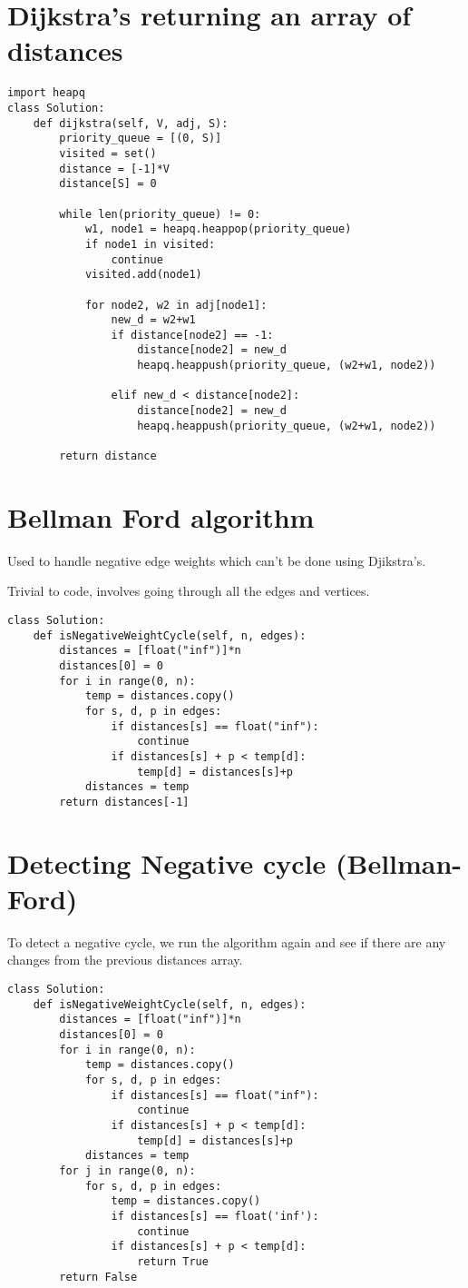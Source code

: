 \documentclass[24pt, a4]{article}
\begin{document}
\section{Dijkstra's returning an array of distances}
\begin{lstlisting}
import heapq
class Solution:
    def dijkstra(self, V, adj, S):
        priority_queue = [(0, S)]
        visited = set()
        distance = [-1]*V
        distance[S] = 0

        while len(priority_queue) != 0:
            w1, node1 = heapq.heappop(priority_queue)
            if node1 in visited:
                continue
            visited.add(node1)

            for node2, w2 in adj[node1]:
                new_d = w2+w1
                if distance[node2] == -1:
                    distance[node2] = new_d
                    heapq.heappush(priority_queue, (w2+w1, node2))

                elif new_d < distance[node2]:
                    distance[node2] = new_d
                    heapq.heappush(priority_queue, (w2+w1, node2))
        
        return distance
\end{lstlisting}
\newpage
\section{Bellman Ford algorithm}
Used to handle negative edge weights which can't be done using Djikstra's.

Trivial to code, involves going through all the edges and vertices.

\begin{lstlisting}
class Solution:
	def isNegativeWeightCycle(self, n, edges):
		distances = [float("inf")]*n
		distances[0] = 0
		for i in range(0, n):
		    temp = distances.copy()
		    for s, d, p in edges:
		        if distances[s] == float("inf"):
		            continue
		        if distances[s] + p < temp[d]:
		            temp[d] = distances[s]+p
		    distances = temp
        return distances[-1]
\end{lstlisting}
\section{Detecting Negative cycle (Bellman-Ford)}
To detect a negative cycle, we run the algorithm again and see if there are 
any changes from the previous distances array.
\begin{lstlisting}
class Solution:
	def isNegativeWeightCycle(self, n, edges):
		distances = [float("inf")]*n
		distances[0] = 0
		for i in range(0, n):
		    temp = distances.copy()
		    for s, d, p in edges:
		        if distances[s] == float("inf"):
		            continue
		        if distances[s] + p < temp[d]:
		            temp[d] = distances[s]+p
		    distances = temp
		for j in range(0, n):
		    for s, d, p in edges:
		        temp = distances.copy()
		        if distances[s] == float('inf'):
		            continue
		        if distances[s] + p < temp[d]:
		            return True
		return False
\end{lstlisting}
\newpage
\end{document}
